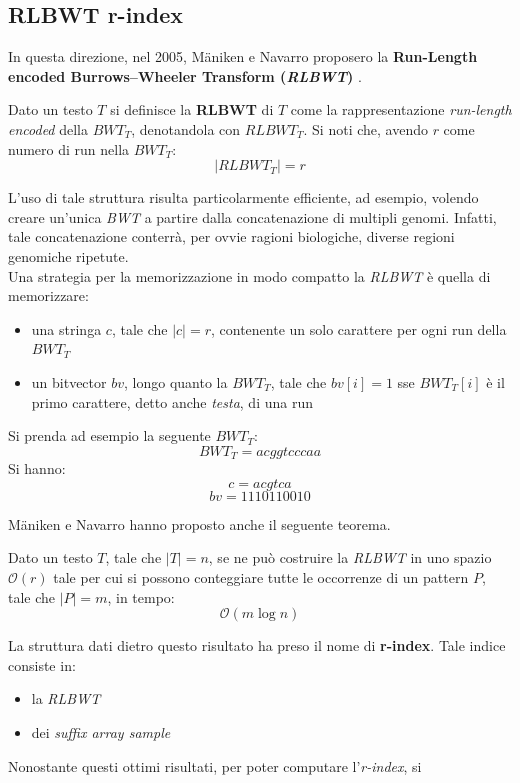 \subsection{RLBWT r-index}
In questa direzione, nel 2005, M\"{a}niken e Navarro proposero la
\textbf{Run-Length encoded Burrows–Wheeler Transform (\textit{RLBWT})}
\cite{rlbwt}.
\begin{definizione}
  Dato un testo $T$ si definisce la \textbf{RLBWT} di $T$
  come la rappresentazione \textit{run-length encoded} della $BWT_T$,
  denotandola con $RLBWT_T$. Si noti che, avendo $r$ come numero di run nella
  $BWT_T$: 
  \[|RLBWT_T|=r\]
\end{definizione}
L'uso di tale
struttura risulta particolarmente efficiente, ad esempio, volendo creare
un'unica \textit{BWT} a partire dalla concatenazione di multipli
genomi. Infatti, tale
concatenazione conterrà, per ovvie ragioni biologiche, diverse regioni genomiche
ripetute. \\
Una strategia per la memorizzazione in modo compatto la \textit{RLBWT} è quella
di memorizzare: 
\begin{itemize}
  \item una stringa $c$, tale che $|c|=r$, contenente un solo carattere per ogni
  run della $BWT_T$
  \item un bitvector $bv$, longo quanto la $BWT_T$, tale che $bv[i]=1$ sse
  $BWT_T[i]$ è il primo carattere, detto anche \textit{testa}, di una run 
\end{itemize}
\begin{esempio}
  Si prenda ad esempio la seguente $BWT_T$:
  \[BWT_T=acggtcccaa\]
  Si hanno:
  \[c=acgtca\]
  \[bv=1110110010\]
\end{esempio}
M\"{a}niken e Navarro hanno proposto anche il seguente teorema.
\begin{teorema}
  Dato un testo $T$, tale che $|T|=n$, se ne può costruire la \textit{RLBWT} in
  uno spazio $\mathcal{O}(r)$ tale per cui si possono conteggiare tutte le
  occorrenze di un pattern $P$, tale che $|P|=m$, in tempo:
  \[\mathcal{O}(m\log n)\]
\end{teorema}
\noindent
La struttura dati dietro questo risultato ha preso il nome di \textbf{r-index}.
Tale indice consiste in: 
\begin{itemize}
  \item la \textit{RLBWT}
  \item dei \textit{suffix array sample}
\end{itemize}
Nonostante questi ottimi risultati, per poter computare l'\textit{r-index}, si
